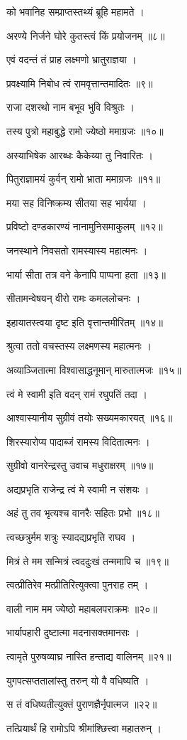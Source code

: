 को भवानिह सम्प्राप्तस्तथ्यं ब्रूहि महामते ।

अरण्ये निर्जने घोरे कुतस्त्वं किं प्रयोजनम् ॥८॥

एवं वदन्तं तं प्राह लक्ष्मणो भ्रातुराज्ञया ।

प्रवक्ष्यामि निबोध त्वं रामवृत्तान्तमादितः ॥९॥

राजा दशरथो नाम बभूव भुवि विश्रुतः ।

तस्य पुत्रो महाबुद्धे रामो ज्येष्ठो ममाग्रजः ॥१०॥

अस्याभिषेक आरब्धः कैकेय्या तु निवारितः ।

पितुराज्ञामयं कुर्वन् रामो भ्राता ममाग्रजः ॥११॥

मया सह विनिष्क्रम्य सीतया सह भार्यया ।

प्रविष्टो दण्डकारण्यं नानामुनिसमाकुलम् ॥१२॥

जनस्थाने निवसतो रामस्यास्य महात्मनः ।

भार्या सीता तत्र वने केनापि पाप्पना हता ॥१३॥

सीतामन्वेषयन् वीरो रामः कमललोचनः ।

इहायातस्त्वया दृष्ट इति वृत्तान्तमीरितम् ॥१४॥

श्रुत्वा ततो वचस्तस्य लक्ष्मणस्य महात्मनः ।

अव्याञ्जितात्मा विश्वासाद्धनूमान् मारुतात्मजः ॥१५॥

त्वं मे स्वामी इति वदन् रामं रघुपतिं तदा ।

आश्वास्यानीय सुग्रीवं तयोः सख्यमकारयत् ॥१६॥

शिरस्यारोप्य पादाब्जं रामस्य विदितात्मनः ।

सुग्रीवो वानरेन्द्रस्तु उवाच मधुराक्षरम् ॥१७॥

अद्यप्रभृति राजेन्द्र त्वं मे स्वामी न संशयः ।

अहं तु तव भृत्यश्च वानरैः सहितः प्रभो ॥१८॥

त्वच्छत्रुर्मम शत्रुः स्यादद्यप्रभृति राघव ।

मित्रं ते मम सन्मित्रं त्वददुःखं तन्ममापि च ॥१९॥

त्वत्प्रीतिरेव मत्प्रीतिरित्युक्त्वा पुनराह तम् ।

वाली नाम मम ज्येष्ठो महाबलपराक्रमः ॥२०॥

भार्यापहारी दुष्टात्मा मदनासक्तमानसः ।

त्वामृते पुरुषव्याघ्र नास्ति हन्ताद्य वालिनम् ॥२१॥

युगपत्सप्ततालांस्तु तरुन् यो वै वधिष्यति ।

स तं वधिष्यतीत्युक्तं पुराणज्ञैर्नृपात्मज ॥२२॥

तत्प्रियार्थं हि रामोऽपि श्रीमांश्छित्त्वा महातरुन् ।

